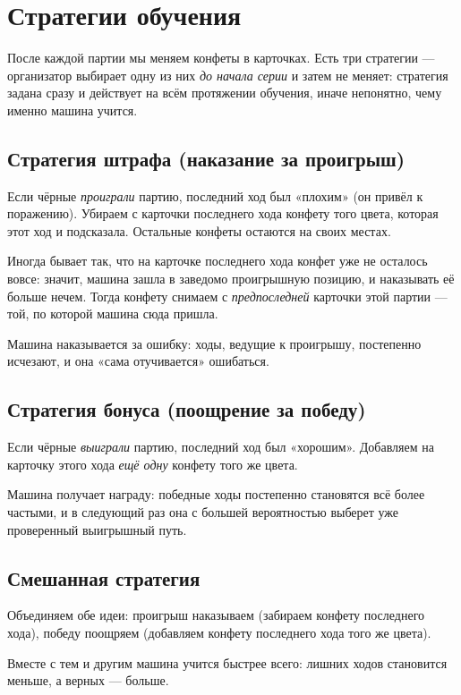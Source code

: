 \documentclass[12pt,a4paper]{article}
\begin{document}
\section*{Стратегии обучения}

После каждой партии мы меняем конфеты в карточках.
Есть три стратегии --- организатор выбирает одну из них \emph{до начала серии} и затем не меняет:
стратегия задана сразу и действует на всём протяжении обучения, иначе непонятно, чему именно машина учится.


\subsection*{Стратегия штрафа (наказание за проигрыш)}

Если чёрные \emph{проиграли} партию, последний ход был «плохим» (он привёл к поражению).
Убираем с карточки последнего хода конфету того цвета, которая этот ход и подсказала.
Остальные конфеты остаются на своих местах.

Иногда бывает так, что на карточке последнего хода конфет уже не осталось вовсе:
значит, машина зашла в заведомо проигрышную позицию, и наказывать её больше нечем.
Тогда конфету снимаем с \emph{предпоследней} карточки этой партии --- той, по которой машина сюда пришла.

Машина наказывается за ошибку: ходы, ведущие к проигрышу, постепенно исчезают, и она «сама отучивается» ошибаться.


\subsection*{Стратегия бонуса (поощрение за победу)}

Если чёрные \emph{выиграли} партию, последний ход был «хорошим».
Добавляем на карточку этого хода \emph{ещё одну} конфету того же цвета.

Машина получает награду:
победные ходы постепенно становятся всё более частыми,
и в следующий раз она с большей вероятностью выберет уже проверенный выигрышный путь.


\subsection*{Смешанная стратегия}

Объединяем обе идеи:
проигрыш наказываем (забираем конфету последнего хода),
победу поощряем (добавляем конфету последнего хода того же цвета).

Вместе с тем и другим машина учится быстрее всего: лишних ходов становится меньше, а верных --- больше.
\end{document}
